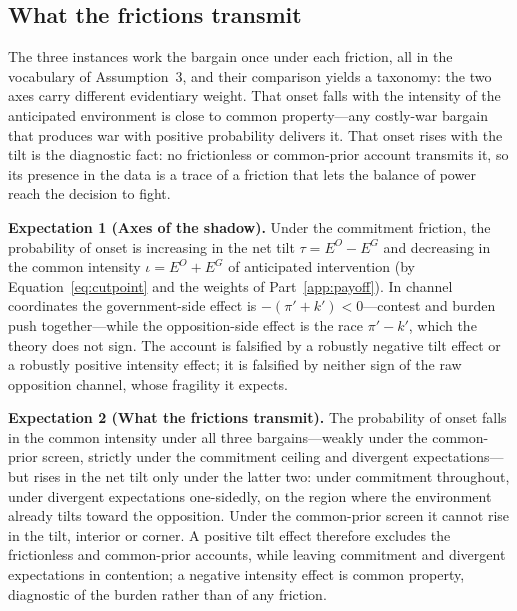 \subsection{What the frictions transmit}
\label{app:transmit}

The three instances work the bargain once under each friction, all in the
vocabulary of Assumption~3, and their comparison yields a taxonomy: the two
axes carry different evidentiary weight.  That onset falls with the intensity
of the anticipated environment is close to common property---any costly-war
bargain that produces war with positive probability delivers it.  That onset
rises with the tilt is the diagnostic fact: no frictionless or common-prior
account transmits it, so its presence in the data is a trace of a friction
that lets the balance of power reach the decision to fight.

\textbf{Expectation 1 (Axes of the shadow).}  Under the commitment friction,
the probability of onset is increasing in the net tilt $\tau = E^O - E^G$ and
decreasing in the common intensity $\iota = E^O + E^G$ of anticipated
intervention (by Equation~\eqref{eq:cutpoint} and the weights of
Part~\ref{app:payoff}).  In channel coordinates the government-side effect is
$-(\pi' + k') < 0$---contest and burden push together---while the
opposition-side effect is the race $\pi' - k'$, which the theory does not
sign.  The account is falsified by a robustly negative tilt effect or a
robustly positive intensity effect; it is falsified by neither sign of the
raw opposition channel, whose fragility it expects.

\textbf{Expectation 2 (What the frictions transmit).}  The probability of
onset falls in the common intensity under all three bargains---weakly under
the common-prior screen, strictly under the commitment ceiling and divergent
expectations---but rises in the net tilt only under the latter two: under
commitment throughout, under divergent expectations one-sidedly, on the
region where the environment already tilts toward the opposition.  Under the
common-prior screen it cannot rise in the tilt, interior or corner.  A
positive tilt effect therefore excludes the frictionless and common-prior
accounts, while leaving commitment and divergent expectations in contention;
a negative intensity effect is common property, diagnostic of the burden
rather than of any friction.

